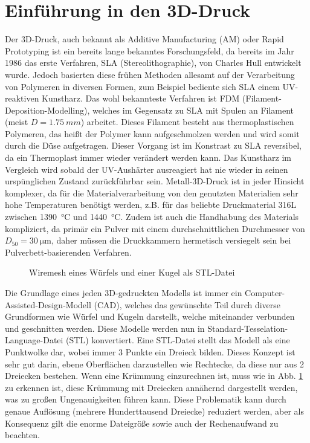 \documentclass[main.tex]{subfiles}
\begin{document}
\section{Einführung in den 3D-Druck}
Der 3D-Druck, auch bekannt als Additive Manufacturing (AM) oder Rapid Prototyping ist ein bereits lange bekanntes Forschungsfeld, da bereits im Jahr 1986 das erste Verfahren, SLA (Stereolithographie), von Charles Hull entwickelt wurde. Jedoch basierten diese frühen Methoden allesamt auf der Verarbeitung von Polymeren in diversen Formen, zum Beispiel bediente sich SLA einem UV-reaktiven Kunstharz. Das wohl bekannteste Verfahren ist FDM (Filament-Deposition-Modelling), welches im Gegensatz zu SLA mit Spulen an Filament (meist $D=\qty{1.75}{mm}$) arbeitet. Dieses Filament besteht aus thermoplastischen Polymeren, das heißt der Polymer kann aufgeschmolzen werden und wird somit durch die Düse aufgetragen. Dieser Vorgang ist im Konstrast zu SLA reversibel, da ein Thermoplast immer wieder verändert werden kann. Das Kunstharz im Vergleich wird sobald der UV-Aushärter ausreagiert hat nie wieder in seinen urspünglichen Zustand zurückführbar sein.\parencite{BHATIA20231060}
Metall-3D-Druck ist in jeder Hinsicht komplexer, da für die Materialverarbeitung von den genutzten Materialien sehr hohe Temperaturen benötigt werden, z.B. für das beliebte Druckmaterial 316L zwischen  \qty{1390}{\celsius} und \qty{1440}{\degreeCelsius}\parencite{610LSTEEL}. Zudem ist auch die Handhabung des Materials kompliziert, da primär ein Pulver mit einem durchschnittlichen Durchmesser von $D_{50}=\SI{30}{\micro\meter}$\parencite[~S.3]{ZAKRZEWSKI2020115}, daher müssen die Druckkammern hermetisch versiegelt sein bei Pulverbett-basierenden Verfahren.

\begin{figure}[h!]
\begin{center}
	\caption{Wiremesh eines Würfels und einer Kugel als STL-Datei}
	\label{img:stl_1}
\end{center}
\end{figure}	

Die Grundlage eines jeden 3D-gedruckten Modells ist immer ein Computer-Assisted-Design-Modell (CAD), welches das gewünschte Teil durch diverse Grundformen wie Würfel und Kugeln darstellt, welche miteinander verbunden und geschnitten werden. Diese Modelle werden nun in Standard-Tesselation-Language-Datei (STL) konvertiert. Eine STL-Datei stellt das Modell als eine Punktwolke dar, wobei immer 3 Punkte ein Dreieck bilden.
Dieses Konzept ist sehr gut darin, ebene Oberflächen darzustellen wie Rechtecke, da diese nur aus 2 Dreiecken bestehen. Wenn eine Krümmung einzurechnen ist, muss wie in Abb. \ref{img:stl_1} zu erkennen ist, diese Krümmung mit Dreiecken annähernd dargestellt werden, was zu großen Ungenauigkeiten führen kann. Diese Problematik kann durch genaue Auflösung (mehrere Hunderttausend Dreiecke) reduziert werden, aber als Konsequenz gilt die enorme Dateigröße sowie auch der Rechenaufwand zu beachten. \parencite{ADOBLESTL} 
\end{document}
